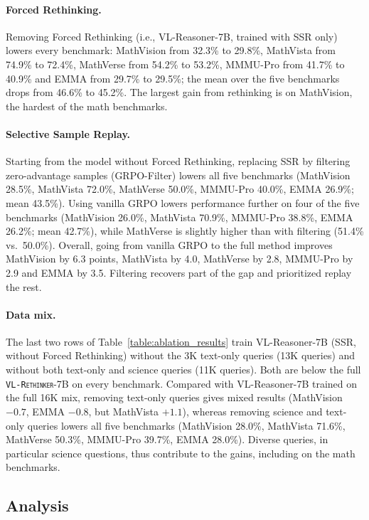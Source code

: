 \documentclass{article}
\newcommand{\model}{\texttt{\textsc{VL-Rethinker}}\xspace}
\begin{document}
\paragraph{Forced Rethinking.} Removing Forced Rethinking (i.e., VL-Reasoner-7B, trained with SSR only) lowers every benchmark: MathVision from 32.3\% to 29.8\%, MathVista from 74.9\% to 72.4\%, MathVerse from 54.2\% to 53.2\%, MMMU-Pro from 41.7\% to 40.9\% and EMMA from 29.7\% to 29.5\%; the mean over the five benchmarks drops from 46.6\% to 45.2\%. The largest gain from rethinking is on MathVision, the hardest of the math benchmarks.

\paragraph{Selective Sample Replay.} Starting from the model without Forced Rethinking, replacing SSR by filtering zero-advantage samples (GRPO-Filter) lowers all five benchmarks (MathVision 28.5\%, MathVista 72.0\%, MathVerse 50.0\%, MMMU-Pro 40.0\%, EMMA 26.9\%; mean 43.5\%). Using vanilla GRPO lowers performance further on four of the five benchmarks (MathVision 26.0\%, MathVista 70.9\%, MMMU-Pro 38.8\%, EMMA 26.2\%; mean 42.7\%), while MathVerse is slightly higher than with filtering (51.4\% vs.\ 50.0\%). Overall, going from vanilla GRPO to the full method improves MathVision by 6.3 points, MathVista by 4.0, MathVerse by 2.8, MMMU-Pro by 2.9 and EMMA by 3.5. Filtering recovers part of the gap and prioritized replay the rest.

\paragraph{Data mix.} The last two rows of Table~\ref{table:ablation_results} train VL-Reasoner-7B (SSR, without Forced Rethinking) without the 3K text-only queries (13K queries) and without both text-only and science queries (11K queries). Both are below the full \model-7B on every benchmark. Compared with VL-Reasoner-7B trained on the full 16K mix, removing text-only queries gives mixed results (MathVision $-0.7$, EMMA $-0.8$, but MathVista $+1.1$), whereas removing science and text-only queries lowers all five benchmarks (MathVision 28.0\%, MathVista 71.6\%, MathVerse 50.3\%, MMMU-Pro 39.7\%, EMMA 28.0\%). Diverse queries, in particular science questions, thus contribute to the gains, including on the math benchmarks.

\subsection{Analysis}
\label{sec:analysis}
\end{document}
